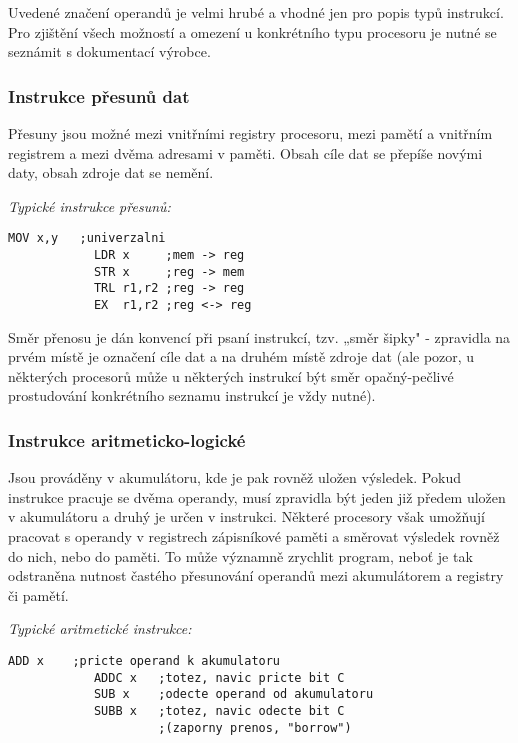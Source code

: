         Uvedené značení operandů je velmi hrubé a vhodné jen pro popis typů instrukcí. Pro zjištění 
        všech možností a omezení u konkrétního typu procesoru je nutné se seznámit s dokumentací 
        výrobce.
        
        \subsubsection{Instrukce přesunů dat}
          Přesuny jsou možné mezi vnitřními registry procesoru, mezi pamětí a vnitřním registrem a 
          mezi dvěma adresami v paměti. Obsah cíle dat se přepíše novými daty, obsah zdroje dat se 
          nemění.
        
          \emph{Typické instrukce přesunů:}
          \begin{lstlisting}[style=luaMITASMStyle]
            MOV x,y   ;univerzalni
            LDR x     ;mem -> reg
            STR x     ;reg -> mem
            TRL r1,r2 ;reg -> reg
            EX  r1,r2 ;reg <-> reg
          \end{lstlisting}
      
          Směr přenosu je dán konvencí při psaní instrukcí, tzv. „směr šipky" - zpravidla na prvém 
          místě je označení cíle dat a na druhém místě zdroje dat (ale pozor, u některých procesorů 
          může u některých instrukcí být směr opačný-pečlivé prostudování konkrétního seznamu 
          instrukcí je vždy nutné).
          
        \subsubsection{Instrukce aritmeticko-logické}           
          Jsou prováděny v akumulátoru, kde je pak rovněž uložen výsledek. Pokud instrukce pracuje 
          se dvěma operandy, musí zpravidla být jeden již předem uložen v akumulátoru a druhý je 
          určen v instrukci. Některé procesory však umožňují pracovat s operandy v registrech 
          zápisníkové paměti a směrovat výsledek rovněž do nich, nebo do paměti. To může významně 
          zrychlit program, neboť je tak odstraněna  nutnost častého přesunování operandů mezi 
          akumulátorem a registry či pamětí.
         
          \emph{Typické aritmetické instrukce:}
          \begin{lstlisting}[style=luaMITASMStyle]
            ADD x    ;pricte operand k akumulatoru
            ADDC x   ;totez, navic pricte bit C
            SUB x    ;odecte operand od akumulatoru
            SUBB x   ;totez, navic odecte bit C 
                     ;(zaporny prenos, "borrow")
          \end{lstlisting}
         
